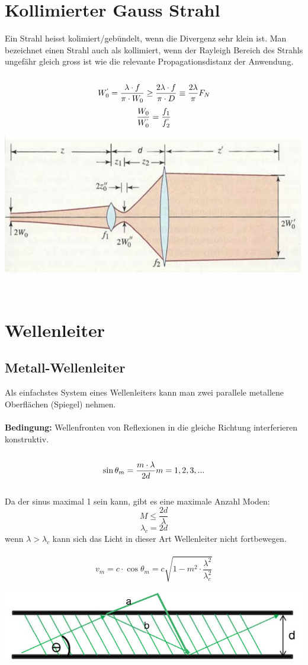 \section{Kollimierter Gauss Strahl}
Ein Strahl heisst kolimiert/gebündelt, wenn die Divergenz sehr klein ist. Man bezeichnet einen Strahl auch als kollimiert, wenn der Rayleigh Bereich des Strahls ungefähr gleich gross ist wie die relevante Propagationsdistanz der Anwendung.\\
\\
\[
	W_0^`=\frac{\lambda\cdot f}{\pi\cdot W_0} \geq
	 \frac{2\lambda\cdot f}{\pi\cdot D} 
	 \equiv \frac{2\lambda}{\pi} F_{N}
\]
\[
	\frac{W_0}{W_0^`}=	\frac{f_1}{f_2^`}
\]
\begin{center}
	\includegraphics[scale = 0.25]{../fig/koll_gauss_strahl.jpg}
\end{center}
\
\\
\section{Wellenleiter}
\subsection{Metall-Wellenleiter}
Als einfachstes System eines Wellenleiters kann man zwei parallele metallene Oberflächen (Spiegel) nehmen.\\
\\
\textbf{Bedingung:} Wellenfronten von Reflexionen in die gleiche Richtung interferieren konstruktiv.\\
\\
\[
	\sin \theta_m= \frac{m \cdot \lambda}{2d}\\
	m=1,2,3,... \\ \\
\]
\\
Da der sinus maximal 1 sein kann, gibt es eine maximale Anzahl Moden:
\[
	M\leq\frac{2d}{\lambda}
\]
\[
	\lambda_c=2d
\]
wenn $\lambda> \lambda_c$ kann sich das Licht in dieser Art Wellenleiter nicht fortbewegen.\\
\
\[
	v_m=c\cdot \cos\theta_m=c\sqrt{1-m^2\cdot\frac{\lambda^2}{\lambda_c^2}}
\] 
\begin{center}
	\includegraphics[scale = 0.3]{../fig/wellenleiter.jpg}
\end{center}
\
\\
